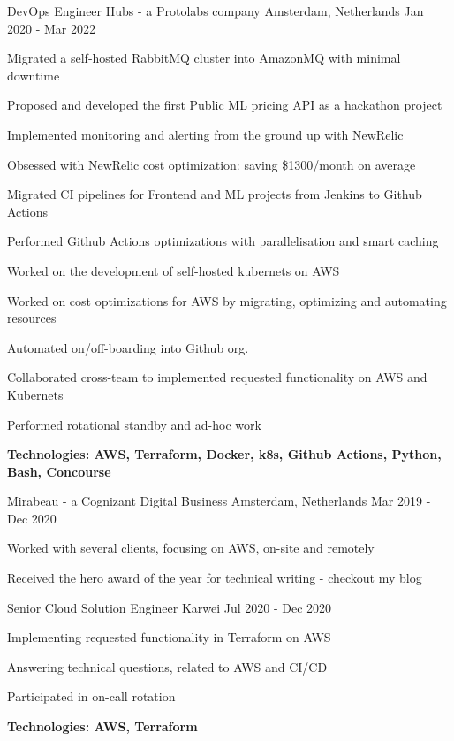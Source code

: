 \begin{cventries}
\cventry
{DevOps Engineer} %
{Hubs - a Protolabs company} %
{Amsterdam, Netherlands} %
{Jan 2020 - Mar 2022} %
{ %
	\begin{cvitems}
		\item {Migrated a self-hosted RabbitMQ cluster into AmazonMQ with minimal downtime}
		\item {Proposed and developed the first Public ML pricing API as a hackathon project}
		\item {Implemented monitoring and alerting from the ground up with NewRelic}
		\item {Obsessed with NewRelic cost optimization: saving \$1300/month on average}
		\item {Migrated CI pipelines for Frontend and ML projects from Jenkins to Github Actions}
		\item {Performed Github Actions optimizations with parallelisation and smart caching}
		\item {Worked on the development of self-hosted kubernets on AWS}
		\item {Worked on cost optimizations for AWS by migrating, optimizing and automating resources}
		\item {Automated on/off-boarding into Github org.}
		\item {Collaborated cross-team to implemented requested functionality on AWS and Kubernets}
		\item {Performed rotational standby and ad-hoc work}
		\item {\bfseries{Technologies:} AWS, Terraform, Docker, k8s, Github Actions, Python, Bash, Concourse}
	\end{cvitems}
}


{Mirabeau - a Cognizant Digital Business}
{Amsterdam, Netherlands}
{Mar 2019 - Dec 2020}
{
	\begin{cvitems}
		\item {Worked with several clients, focusing on AWS, on-site and remotely}
		\item {Received the hero award of the year for technical writing - checkout my blog}
	\end{cvitems}
}

\hfill\begin{minipage}{\dimexpr\textwidth-1cm}
\xdef\tpd{\the\prevdepth}
\begin{cventrystack}
	\cventry
	{Senior Cloud Solution Engineer} %
	{Karwei} %
	{} %
	{Jul 2020 - Dec 2020} %
	{
		\begin{cvitems}
			\item {Implementing requested functionality in Terraform on AWS}
			\item {Answering technical questions, related to AWS and CI/CD}
			\item {Participated in on-call rotation}
			\item {\bfseries{Technologies:} AWS, Terraform}
		\end{cvitems}
	}


\end{cventrystack}
\end{minipage}
\end{cventries}
